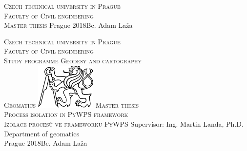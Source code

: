 \begin{center}
\newcommand{\napisCVUT}{Czech technical university in Prague}
\newcommand{\napisFS}{Faculty of Civil engineering}
\newcommand{\napisProgram}{Study programme Geodesy and cartography}
\newcommand{\napisObor}{Geomatics}
\newcommand{\napisKatedra}{Department of geomatics}
\newcommand{\napisVedouci}{Supervisor: Ing. Martin Landa, Ph.D.}
\newcommand{\napisAutor}{Bc. Adam Laža}
\newcommand{\napisDatum}{Prague 2018}
\newcommand{\napisNazevI}{Process isolation in PyWPS framework}
\newcommand{\napisNazevAjI}{Izolace procesů ve frameworku PyWPS}
\newcommand{\napisDiplomka}{Master thesis}
\newcommand{\napisPraha}{Prague 2018}
%
\newcommand{\velka}[1]{\textsc{#1}}
%
% 
\newif\ifpatitul
\patitultrue

\ifpatitul
{\Large\velka{\napisCVUT}}\\
\velka{\Large\napisFS}\\
\vfill
{\LARGE\velka{\napisDiplomka}}
\vfill
{\large\napisPraha\hfill\napisAutor}
\newpage
\fi%


{\Large\velka{\napisCVUT}}\\
{\Large\velka{\napisFS}}\\
{\Large\velka{\napisProgram}}\\
{\Large\velka{\napisObor}}
\vfill
\includegraphics[width=3cm]{logo_cvut_cb} %
\vfill
{\Large\velka{\napisDiplomka}}\\
\Large\velka{\napisNazevI}\\
\large\velka{\napisNazevAjI}
\vfill
{\large%
\napisVedouci\\
\napisKatedra\\
\bigskip
\napisDatum\hfill\napisAutor}
\end{center}
